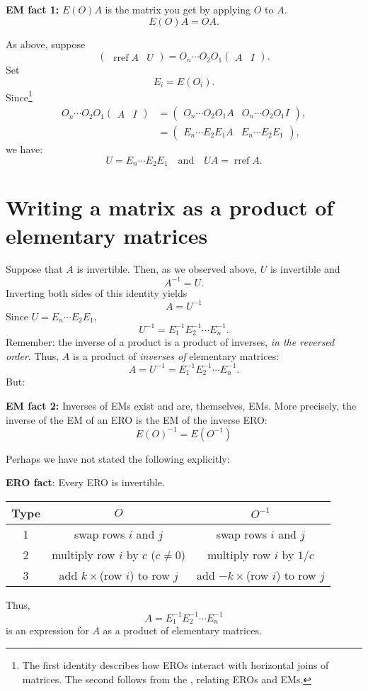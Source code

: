 \documentclass[17pt]{amsart}
\DeclareMathOperator{\rref}{rref}
\begin{document}
\bigskip\textbf{EM fact 1:} $E(O)A$ is the matrix you get by applying $O$ to $A$.
\[
E(O)A=OA.
\]

As above, suppose
\[
\left(
\begin{array}{c|c}
\rref A&U
\end{array}
\right)=O_n\cdots O_2O_1\left(
\begin{array}{c|c}
A&I
\end{array}
\right).
\]
Set
\[
E_i = E(O_i).
\]
Since\footnote{The first identity describes how EROs interact with horizontal joins of matrices. The second follows from the , relating EROs and EMs.}
\begin{align*}
O_n\cdots O_2O_1\left(
\begin{array}{c|c}
A&I
\end{array}
\right)&=
\left(
\begin{array}{c|c}
O_n\cdots O_2O_1A&O_n\cdots O_2O_1I
\end{array}
\right),\\
&= \left(\begin{array}{c|c}
E_n\cdots E_2E_1A&
E_n\cdots E_2E_1
\end{array}\right),
\end{align*}
we have:
\[
U=E_n\cdots E_2E_1\quad\text{and}\quad UA=\rref A.
\]

\section{Writing a matrix as a product of elementary matrices}
Suppose that $A$ is invertible.
Then, as we observed above, $U$ is invertible and
\[
A^{-1}=U.
\]
Inverting both sides of this identity yields
\[
A=U^{-1}
\]
Since $U=E_n\cdots E_2E_1$,
\[
U^{-1}=E_1^{-1}E_2^{-1}\cdots E_n^{-1}.
\]
Remember: the inverse of a product is a product of inverses, \emph{in the reversed order}.
Thus, $A$ is a product of \emph{inverses of} elementary matrices:
\[
A = U^{-1}=E_1^{-1}E_2^{-1}\cdots E_n^{-1}.
\]
But:

\bigskip\textbf{EM fact 2:} Inverses of EMs exist and are, themselves, EMs. More precisely, the inverse of the EM of an ERO is the EM of the inverse ERO:
\[
E(O)^{-1} = E(O^{-1})
\]

Perhaps we have not stated the following explicitly:

\bigskip\textbf{ERO fact}: Every ERO is invertible.

\begin{center}
\begin{tabular}{c|c|c}
Type & $O$ & $O^{-1}$\\ \hline
1& swap rows $i$ and $j$ & swap rows $i$ and $j$\\
2& multiply row $i$ by $c$ ($c\neq 0$) & multiply row $i$ by $1/c$\\
3& add $k\times$(row $i$) to row $j$& add $-k\times$(row $i$) to row $j$
\end{tabular}
\end{center}

Thus, 
\[
A=E_1^{-1}E_2^{-1}\cdots E_n^{-1}
\]
is an expression for $A$ as a product of elementary matrices.
\end{document}
